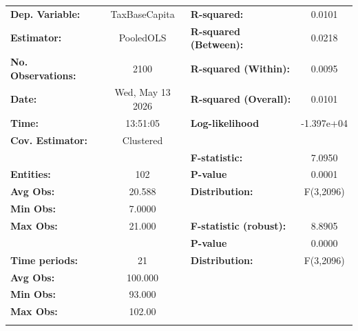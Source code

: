 \begin{center}
\begin{tabular}{lclc}
\toprule
\textbf{Dep. Variable:}          &   TaxBaseCapita    & \textbf{  R-squared:         }   &      0.0101      \\
\textbf{Estimator:}              &     PooledOLS      & \textbf{  R-squared (Between):}  &      0.0218      \\
\textbf{No. Observations:}       &        2100        & \textbf{  R-squared (Within):}   &      0.0095      \\
\textbf{Date:}                   &  Wed, May 13 2026  & \textbf{  R-squared (Overall):}  &      0.0101      \\
\textbf{Time:}                   &      13:51:05      & \textbf{  Log-likelihood     }   &    -1.397e+04    \\
\textbf{Cov. Estimator:}         &     Clustered      & \textbf{                     }   &                  \\
\textbf{}                        &                    & \textbf{  F-statistic:       }   &      7.0950      \\
\textbf{Entities:}               &        102         & \textbf{  P-value            }   &      0.0001      \\
\textbf{Avg Obs:}                &       20.588       & \textbf{  Distribution:      }   &    F(3,2096)     \\
\textbf{Min Obs:}                &       7.0000       & \textbf{                     }   &                  \\
\textbf{Max Obs:}                &       21.000       & \textbf{  F-statistic (robust):} &      8.8905      \\
\textbf{}                        &                    & \textbf{  P-value            }   &      0.0000      \\
\textbf{Time periods:}           &         21         & \textbf{  Distribution:      }   &    F(3,2096)     \\
\textbf{Avg Obs:}                &      100.000       & \textbf{                     }   &                  \\
\textbf{Min Obs:}                &       93.000       & \textbf{                     }   &                  \\
\textbf{Max Obs:}                &       102.00       & \textbf{                     }   &                  \\
\textbf{}                        &                    & \textbf{                     }   &                  \\

\end{tabular}
\end{center}
